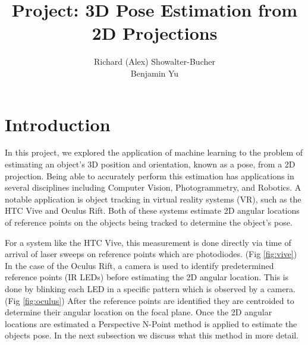 \documentclass[journal]{IEEEtran}
\begin{document}
%
\title{Project: 3D Pose Estimation from 2D Projections}
%
%
%

\author{Richard (Alex) Showalter-Bucher\\Benjamin Yu}


\maketitle

\section{Introduction}
In this project, we explored the application of machine learning to the problem of estimating an object's 3D position and orientation, known as a pose, from a 2D projection. Being able to accurately perform this estimation has applications in several disciplines including Computer Vision, Photogrammetry, and Robotics\cite{Robust_PNP}. A notable application is object tracking in virtual reality systems (VR), such as the HTC Vive and Oculus Rift. Both of these systems estimate 2D angular locations of reference points on the objects being tracked to determine the object's pose.

For a system like the HTC Vive, this measurement is done directly via time of arrival of laser sweeps on reference points which are photodiodes. (Fig \ref{fig:vive}) In the case of the Oculus Rift, a camera is used to identify predetermined reference points (IR LEDs) before estimating the 2D angular location. This is done by blinking each LED in a specific pattern which is observed by a camera. (Fig \ref{fig:oculus}) After the reference points are identified they are centroided to determine their angular location on the focal plane. Once the 2D angular locations are estimated a Perspective N-Point method is applied to estimate the objects pose. In the next subsection we discuss what this method in more detail. 
\end{document}
